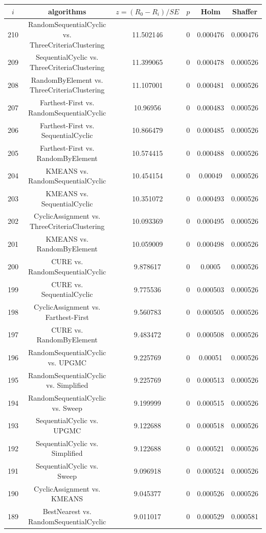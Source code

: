 \documentclass[a4paper,10pt]{article}
\begin{document}
\begin{landscape}
\begin{table}[!htp]
\centering\scriptsize
\begin{tabular}{cccccc}
$i$&algorithms&$z=(R_0 - R_i)/SE$&$p$&Holm&Shaffer\\
\hline210&RandomSequentialCyclic vs. ThreeCriteriaClustering&11.502146&0&0.000476&0.000476\\
209&SequentialCyclic vs. ThreeCriteriaClustering&11.399065&0&0.000478&0.000526\\
208&RandomByElement vs. ThreeCriteriaClustering&11.107001&0&0.000481&0.000526\\
207&Farthest-First vs. RandomSequentialCyclic&10.96956&0&0.000483&0.000526\\
206&Farthest-First vs. SequentialCyclic&10.866479&0&0.000485&0.000526\\
205&Farthest-First vs. RandomByElement&10.574415&0&0.000488&0.000526\\
204&KMEANS vs. RandomSequentialCyclic&10.454154&0&0.00049&0.000526\\
203&KMEANS vs. SequentialCyclic&10.351072&0&0.000493&0.000526\\
202&CyclicAssignment vs. ThreeCriteriaClustering&10.093369&0&0.000495&0.000526\\
201&KMEANS vs. RandomByElement&10.059009&0&0.000498&0.000526\\
200&CURE vs. RandomSequentialCyclic&9.878617&0&0.0005&0.000526\\
199&CURE vs. SequentialCyclic&9.775536&0&0.000503&0.000526\\
198&CyclicAssignment vs. Farthest-First&9.560783&0&0.000505&0.000526\\
197&CURE vs. RandomByElement&9.483472&0&0.000508&0.000526\\
196&RandomSequentialCyclic vs. UPGMC&9.225769&0&0.00051&0.000526\\
195&RandomSequentialCyclic vs. Simplified&9.225769&0&0.000513&0.000526\\
194&RandomSequentialCyclic vs. Sweep&9.199999&0&0.000515&0.000526\\
193&SequentialCyclic vs. UPGMC&9.122688&0&0.000518&0.000526\\
192&SequentialCyclic vs. Simplified&9.122688&0&0.000521&0.000526\\
191&SequentialCyclic vs. Sweep&9.096918&0&0.000524&0.000526\\
190&CyclicAssignment vs. KMEANS&9.045377&0&0.000526&0.000526\\
189&BestNearest vs. RandomSequentialCyclic&9.011017&0&0.000529&0.000581\\

\end{tabular}
\end{table}
\end{landscape}
\end{document}
